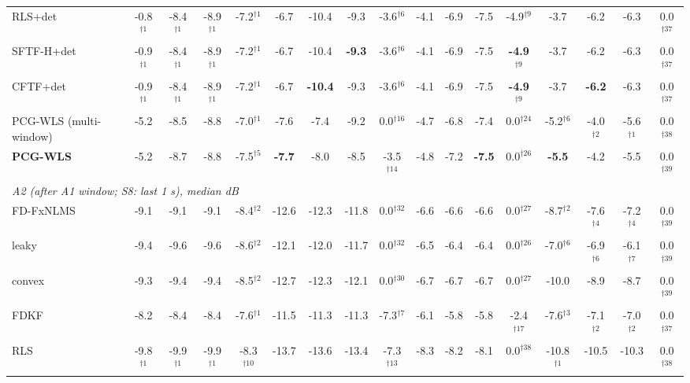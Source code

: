 \begin{table}[t]
{\begin{tabular}{lcccccccccccccccc}
RLS+det & -0.8$^{\dagger1}$ & -8.4$^{\dagger1}$ & -8.9$^{\dagger1}$ & -7.2$^{\dagger1}$ & -6.7 & -10.4 & -9.3 & -3.6$^{\dagger6}$ & -4.1 & -6.9 & -7.5 & -4.9$^{\dagger9}$ & -3.7 & -6.2 & -6.3 & 0.0$^{\dagger37}$ \\
SFTF-H+det & -0.9$^{\dagger1}$ & -8.4$^{\dagger1}$ & -8.9$^{\dagger1}$ & -7.2$^{\dagger1}$ & -6.7 & -10.4 & \textbf{-9.3} & -3.6$^{\dagger6}$ & -4.1 & -6.9 & -7.5 & \textbf{-4.9$^{\dagger9}$} & -3.7 & -6.2 & -6.3 & 0.0$^{\dagger37}$ \\
CFTF+det & -0.9$^{\dagger1}$ & -8.4$^{\dagger1}$ & -8.9$^{\dagger1}$ & -7.2$^{\dagger1}$ & -6.7 & \textbf{-10.4} & -9.3 & -3.6$^{\dagger6}$ & -4.1 & -6.9 & -7.5 & \textbf{-4.9$^{\dagger9}$} & -3.7 & \textbf{-6.2} & -6.3 & 0.0$^{\dagger37}$ \\
PCG-WLS (multi-window) & -5.2 & -8.5 & -8.8 & -7.0$^{\dagger1}$ & -7.6 & -7.4 & -9.2 & 0.0$^{\dagger16}$ & -4.7 & -6.8 & -7.4 & 0.0$^{\dagger24}$ & -5.2$^{\dagger6}$ & -4.0$^{\dagger2}$ & -5.6$^{\dagger1}$ & 0.0$^{\dagger38}$ \\
\textbf{PCG-WLS} & -5.2 & -8.7 & -8.8 & -7.5$^{\dagger5}$ & \textbf{-7.7} & -8.0 & -8.5 & -3.5$^{\dagger14}$ & -4.8 & -7.2 & \textbf{-7.5} & 0.0$^{\dagger26}$ & \textbf{-5.5} & -4.2 & -5.5 & 0.0$^{\dagger39}$ \\
\midrule
\multicolumn{17}{l}{\emph{A2 (after A1 window; S8: last 1 s), median dB}}\\
FD-FxNLMS & -9.1 & -9.1 & -9.1 & -8.4$^{\dagger2}$ & -12.6 & -12.3 & -11.8 & 0.0$^{\dagger32}$ & -6.6 & -6.6 & -6.6 & 0.0$^{\dagger27}$ & -8.7$^{\dagger2}$ & -7.6$^{\dagger4}$ & -7.2$^{\dagger4}$ & 0.0$^{\dagger39}$ \\
leaky & -9.4 & -9.6 & -9.6 & -8.6$^{\dagger2}$ & -12.1 & -12.0 & -11.7 & 0.0$^{\dagger32}$ & -6.5 & -6.4 & -6.4 & 0.0$^{\dagger26}$ & -7.0$^{\dagger6}$ & -6.9$^{\dagger6}$ & -6.1$^{\dagger7}$ & 0.0$^{\dagger39}$ \\
convex & -9.3 & -9.4 & -9.4 & -8.5$^{\dagger2}$ & -12.7 & -12.3 & -12.1 & 0.0$^{\dagger30}$ & -6.7 & -6.7 & -6.7 & 0.0$^{\dagger27}$ & -10.0 & -8.9 & -8.7 & 0.0$^{\dagger39}$ \\
FDKF & -8.2 & -8.4 & -8.4 & -7.6$^{\dagger1}$ & -11.5 & -11.3 & -11.3 & -7.3$^{\dagger7}$ & -6.1 & -5.8 & -5.8 & -2.4$^{\dagger17}$ & -7.6$^{\dagger3}$ & -7.1$^{\dagger2}$ & -7.0$^{\dagger2}$ & 0.0$^{\dagger37}$ \\
RLS & -9.8$^{\dagger1}$ & -9.9$^{\dagger1}$ & -9.9$^{\dagger1}$ & -8.3$^{\dagger10}$ & -13.7 & -13.6 & -13.4 & -7.3$^{\dagger13}$ & -8.3 & -8.2 & -8.1 & 0.0$^{\dagger38}$ & -10.8$^{\dagger1}$ & -10.5 & -10.3 & 0.0$^{\dagger38}$ \\

\end{tabular}}
\end{table}
